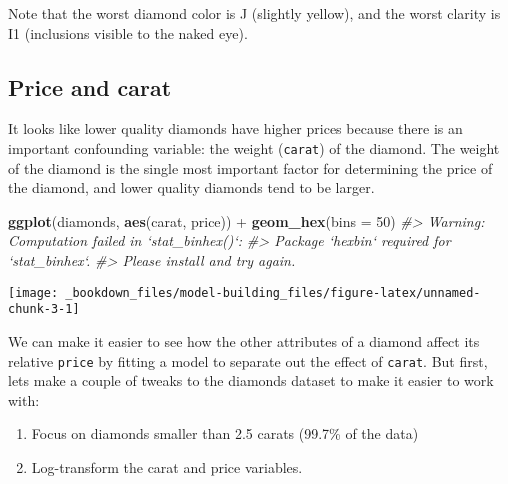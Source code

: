\documentclass[]{book}
\newenvironment{Shaded}{\begin{snugshade}}{\end{snugshade}}
\newcommand{\KeywordTok}[1]{\textcolor[rgb]{0.13,0.29,0.53}{\textbf{{#1}}}}
\newcommand{\DataTypeTok}[1]{\textcolor[rgb]{0.13,0.29,0.53}{{#1}}}
\newcommand{\DecValTok}[1]{\textcolor[rgb]{0.00,0.00,0.81}{{#1}}}
\newcommand{\FloatTok}[1]{\textcolor[rgb]{0.00,0.00,0.81}{{#1}}}
\newcommand{\StringTok}[1]{\textcolor[rgb]{0.31,0.60,0.02}{{#1}}}
\newcommand{\CommentTok}[1]{\textcolor[rgb]{0.56,0.35,0.01}{\textit{{#1}}}}
\newcommand{\NormalTok}[1]{{#1}}
\providecommand{\tightlist}{%
  \setlength{\itemsep}{0pt}\setlength{\parskip}{0pt}}
\begin{document}
Note that the worst diamond color is J (slightly yellow), and the worst
clarity is I1 (inclusions visible to the naked eye).

\subsection{Price and carat}\label{price-and-carat}

It looks like lower quality diamonds have higher prices because there is
an important confounding variable: the weight (\texttt{carat}) of the
diamond. The weight of the diamond is the single most important factor
for determining the price of the diamond, and lower quality diamonds
tend to be larger.

\begin{Shaded}
\begin{Highlighting}[]
\KeywordTok{ggplot}\NormalTok{(diamonds, }\KeywordTok{aes}\NormalTok{(carat, price)) +}\StringTok{ }
\StringTok{  }\KeywordTok{geom_hex}\NormalTok{(}\DataTypeTok{bins =} \DecValTok{50}\NormalTok{)}
\CommentTok{#> Warning: Computation failed in `stat_binhex()`:}
\CommentTok{#> Package `hexbin` required for `stat_binhex`.}
\CommentTok{#> Please install and try again.}
\end{Highlighting}
\end{Shaded}

\begin{center}\texttt{[image: \_bookdown\_files/model-building\_files/figure-latex/unnamed-chunk-3-1]} \end{center}

We can make it easier to see how the other attributes of a diamond
affect its relative \texttt{price} by fitting a model to separate out
the effect of \texttt{carat}. But first, lets make a couple of tweaks to
the diamonds dataset to make it easier to work with:

\begin{enumerate}
\def\labelenumi{\arabic{enumi}.}
\tightlist
\item
  Focus on diamonds smaller than 2.5 carats (99.7\% of the data)
\item
  Log-transform the carat and price variables.
\end{enumerate}

\begin{Shaded}
\end{Shaded}
\end{document}
